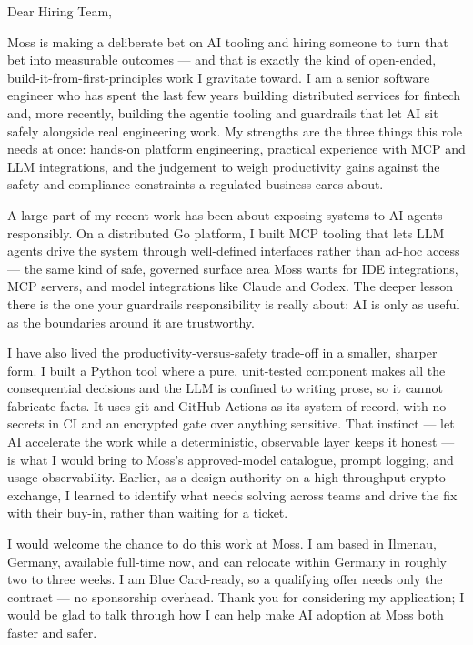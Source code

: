 \documentclass[11pt,a4paper]{coverletter}
\begin{document}

\opening{Dear Hiring Team,}

Moss is making a deliberate bet on AI tooling and hiring someone to turn that bet into measurable outcomes — and that is exactly the kind of open-ended, build-it-from-first-principles work I gravitate toward. I am a senior software engineer who has spent the last few years building distributed services for fintech and, more recently, building the agentic tooling and guardrails that let AI sit safely alongside real engineering work. My strengths are the three things this role needs at once: hands-on platform engineering, practical experience with MCP and LLM integrations, and the judgement to weigh productivity gains against the safety and compliance constraints a regulated business cares about.

A large part of my recent work has been about exposing systems to AI agents responsibly. On a distributed Go platform, I built MCP tooling that lets LLM agents drive the system through well-defined interfaces rather than ad-hoc access — the same kind of safe, governed surface area Moss wants for IDE integrations, MCP servers, and model integrations like Claude and Codex. The deeper lesson there is the one your guardrails responsibility is really about: AI is only as useful as the boundaries around it are trustworthy.

I have also lived the productivity-versus-safety trade-off in a smaller, sharper form. I built a Python tool where a pure, unit-tested component makes all the consequential decisions and the LLM is confined to writing prose, so it cannot fabricate facts. It uses git and GitHub Actions as its system of record, with no secrets in CI and an encrypted gate over anything sensitive. That instinct — let AI accelerate the work while a deterministic, observable layer keeps it honest — is what I would bring to Moss's approved-model catalogue, prompt logging, and usage observability. Earlier, as a design authority on a high-throughput crypto exchange, I learned to identify what needs solving across teams and drive the fix with their buy-in, rather than waiting for a ticket.

I would welcome the chance to do this work at Moss. I am based in Ilmenau, Germany, available full-time now, and can relocate within Germany in roughly two to three weeks. I am Blue Card-ready, so a qualifying offer needs only the contract — no sponsorship overhead. Thank you for considering my application; I would be glad to talk through how I can help make AI adoption at Moss both faster and safer.
\end{document}
